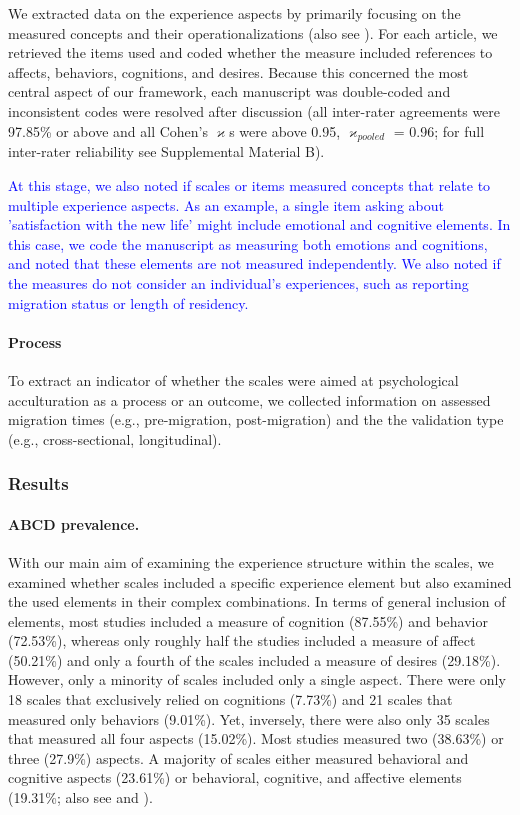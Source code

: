 We extracted data on the experience aspects by primarily focusing on the
measured concepts and their operationalizations (also see
). For each article, we retrieved the items
used and coded whether the measure included references to affects,
behaviors, cognitions, and desires. Because this concerned the most
central aspect of our framework, each manuscript was double-coded and
inconsistent codes were resolved after discussion (all inter-rater
agreements were 97.85\% or above and all Cohen's \(\varkappa\)s were
above 0.95, \(\varkappa_{pooled}\) = 0.96; for full inter-rater
reliability see Supplemental Material B).

\textcolor{blue}{At this stage, we also noted if scales or items measured concepts that relate to multiple experience aspects. As an example, a single item asking about 'satisfaction with the new life' might include emotional and cognitive elements. In this case, we code the manuscript as measuring both emotions and cognitions, and noted that these elements are not measured independently. We also noted if the measures do not consider an individual's experiences, such as reporting migration status or length of residency.}

\paragraph{Process}

To extract an indicator of whether the scales were aimed at
psychological acculturation as a process or an outcome, we collected
information on assessed migration times (e.g., pre-migration,
post-migration) and the the validation type (e.g., cross-sectional,
longitudinal).

\subsubsection{Results}

\paragraph{ABCD prevalence.}

With our main aim of examining the experience structure within the
scales, we examined whether scales included a specific experience
element but also examined the used elements in their complex
combinations. In terms of general inclusion of elements, most studies
included a measure of cognition (87.55\%) and behavior (72.53\%),
whereas only roughly half the studies included a measure of affect
(50.21\%) and only a fourth of the scales included a measure of desires
(29.18\%). However, only a minority of scales included only a single
aspect. There were only 18 scales that exclusively relied on cognitions
(7.73\%) and 21 scales that measured only behaviors (9.01\%). Yet,
inversely, there were also only 35 scales that measured all four aspects
(15.02\%). Most studies measured two (38.63\%) or three (27.9\%)
aspects. A majority of scales either measured behavioral and cognitive
aspects (23.61\%) or behavioral, cognitive, and affective elements
(19.31\%; also see  and
).


